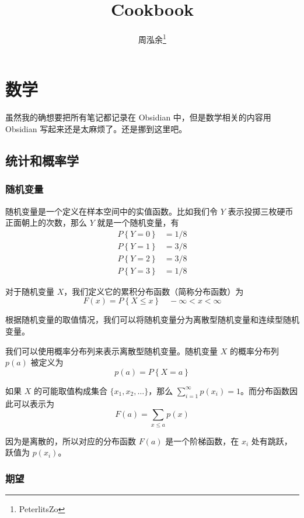 \documentclass[utf8,a4paper,nofonts,9pt]{ctexbook}
\title{Cookbook}
\author{周泓余\thanks{PeterlitsZo}}
\begin{document}
\maketitle

\tableofcontents
\newpage

\chapter{数学}

虽然我的确想要把所有笔记都记录在 Obsidian 中，但是数学相关的内容用 Obsidian 写起来还是太麻烦了。还是挪到这里吧。

\section{统计和概率学}

\subsection{随机变量}

随机变量是一个定义在样本空间中的实值函数。比如我们令 $Y$ 表示投掷三枚硬币正面朝上的次数，那么 $Y$ 就是一个随机变量，有
\begin{align*}
    P\left\{Y = 0\right\} & = 1 / 8 \\
    P\left\{Y = 1\right\} & = 3 / 8 \\
    P\left\{Y = 2\right\} & = 3 / 8 \\
    P\left\{Y = 3\right\} & = 1 / 8
\end{align*}

对于随机变量 $X$，我们定义它的累积分布函数（简称分布函数）为
\[
    F(x) = P\left\{ X \le x \right\} \quad -\infty < x < \infty
\]

根据随机变量的取值情况，我们可以将随机变量分为离散型随机变量和连续型随机变量。

我们可以使用概率分布列来表示离散型随机变量。随机变量 $X$ 的概率分布列 $p(a)$ 被定义为
\[
    p(a) = P\left\{ X = a \right\}
\]

如果 $X$ 的可能取值构成集合 $\{x_1, x_2, \ldots\}$，那么 $\sum_{i = 1}^\infty p(x_i) = 1$。而分布函数因此可以表示为
\[
    F(a) = \sum_{x \le a} p(x)
\]

因为是离散的，所以对应的分布函数 $F(a)$ 是一个阶梯函数，在 $x_i$ 处有跳跃，跃值为 $p(x_i)$。


\subsection{期望}
\end{document}
